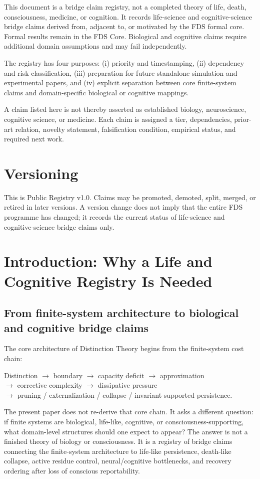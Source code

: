 \documentclass[10pt,a4paper,twocolumn,aps,prl]{revtex4-2}
\theoremstyle{claimstyle}
\theoremstyle{definition}
\newcommand{\DT}{Distinction Theory}
\newcommand{\FDS}{FDS}
\begin{document}
This document is a bridge claim registry, not a completed theory of life, death, consciousness, medicine, or cognition. It records life-science and cognitive-science bridge claims derived from, adjacent to, or motivated by the \FDS{} formal core. Formal results remain in the \FDS{} Core. Biological and cognitive claims require additional domain assumptions and may fail independently.

The registry has four purposes: (i) priority and timestamping, (ii) dependency and risk classification, (iii) preparation for future standalone simulation and experimental papers, and (iv) explicit separation between core finite-system claims and domain-specific biological or cognitive mappings.

A claim listed here is not thereby asserted as established biology, neuroscience, cognitive science, or medicine. Each claim is assigned a tier, dependencies, prior-art relation, novelty statement, falsification condition, empirical status, and required next work.

\section*{Versioning}

This is Public Registry v1.0. Claims may be promoted, demoted, split, merged, or retired in later versions. A version change does not imply that the entire \FDS{} programme has changed; it records the current status of life-science and cognitive-science bridge claims only.

\section{Introduction: Why a Life and Cognitive Registry Is Needed}

\subsection{From finite-system architecture to biological and cognitive bridge claims}

The core architecture of \DT{} begins from the finite-system cost chain:
\begin{center}
\small
Distinction $\rightarrow$ boundary $\rightarrow$ capacity deficit $\rightarrow$ approximation \\
$\rightarrow$ corrective complexity $\rightarrow$ dissipative pressure \\
$\rightarrow$ pruning / externalization / collapse / invariant-supported persistence.
\end{center}
The present paper does not re-derive that core chain. It asks a different question: if finite systems are biological, life-like, cognitive, or consciousness-supporting, what domain-level structures should one expect to appear? The answer is not a finished theory of biology or consciousness. It is a registry of bridge claims connecting the finite-system architecture to life-like persistence, death-like collapse, active residue control, neural/cognitive bottlenecks, and recovery ordering after loss of conscious reportability.
\end{document}
